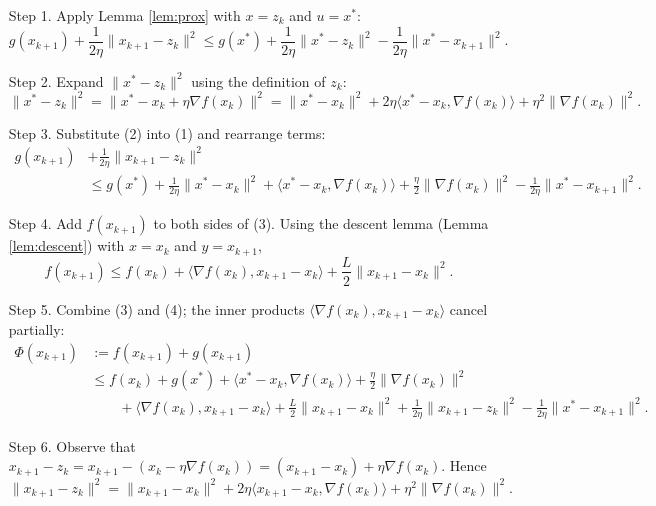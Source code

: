\documentclass{article}
\begin{document}
\begin{enumerate}
\item[Step 1.] Apply Lemma \ref{lem:prox} with $x=z_{k}$ and $u=x^{*}$:
\[
g(x_{k+1})+\frac{1}{2\eta}\|x_{k+1}-z_{k}\|^{2}
\le g(x^{*})+\frac{1}{2\eta}\|x^{*}-z_{k}\|^{2}
-\frac{1}{2\eta}\|x^{*}-x_{k+1}\|^{2}.
\tag{1}
\]

\item[Step 2.] Expand $\|x^{*}-z_{k}\|^{2}$ using the definition of $z_{k}$:
\[
\|x^{*}-z_{k}\|^{2}
= \|x^{*}-x_{k}+\eta\nabla f(x_{k})\|^{2}
= \|x^{*}-x_{k}\|^{2}+2\eta\langle x^{*}-x_{k},\nabla f(x_{k})\rangle
+\eta^{2}\|\nabla f(x_{k})\|^{2}.
\tag{2}
\]

\item[Step 3.] Substitute (2) into (1) and rearrange terms:
\[
\begin{aligned}
g(x_{k+1}) &+ \frac{1}{2\eta}\|x_{k+1}-z_{k}\|^{2}
\\
&\le g(x^{*})+\frac{1}{2\eta}\|x^{*}-x_{k}\|^{2}
+\langle x^{*}-x_{k},\nabla f(x_{k})\rangle
+\frac{\eta}{2}\|\nabla f(x_{k})\|^{2}
-\frac{1}{2\eta}\|x^{*}-x_{k+1}\|^{2}.
\end{aligned}
\tag{3}
\]

\item[Step 4.] Add $f(x_{k+1})$ to both sides of (3). Using the descent lemma (Lemma \ref{lem:descent}) with $x=x_{k}$ and $y=x_{k+1}$,
\[
f(x_{k+1})\le f(x_{k})+\langle\nabla f(x_{k}),x_{k+1}-x_{k}\rangle
+\frac{L}{2}\|x_{k+1}-x_{k}\|^{2}.
\tag{4}
\]

\item[Step 5.] Combine (3) and (4); the inner products $\langle\nabla f(x_{k}),x_{k+1}-x_{k}\rangle$ cancel partially:
\[
\begin{aligned}
\Phi(x_{k+1}) &:= f(x_{k+1})+g(x_{k+1})\\
&\le f(x_{k})+g(x^{*})+\langle x^{*}-x_{k},\nabla f(x_{k})\rangle
+\frac{\eta}{2}\|\nabla f(x_{k})\|^{2}
\\
&\qquad +\langle\nabla f(x_{k}),x_{k+1}-x_{k}\rangle
+\frac{L}{2}\|x_{k+1}-x_{k}\|^{2}
+\frac{1}{2\eta}\|x_{k+1}-z_{k}\|^{2}
-\frac{1}{2\eta}\|x^{*}-x_{k+1}\|^{2}.
\end{aligned}
\tag{5}
\]

\item[Step 6.] Observe that $x_{k+1}-z_{k}=x_{k+1}-(x_{k}-\eta\nabla f(x_{k}))
= (x_{k+1}-x_{k})+\eta\nabla f(x_{k})$.
Hence
\[
\|x_{k+1}-z_{k}\|^{2}= \|x_{k+1}-x_{k}\|^{2}+2\eta\langle x_{k+1}-x_{k},\nabla f(x_{k})\rangle+\eta^{2}\|\nabla f(x_{k})\|^{2}.
\tag{6}
\]


\end{enumerate}
\end{document}
